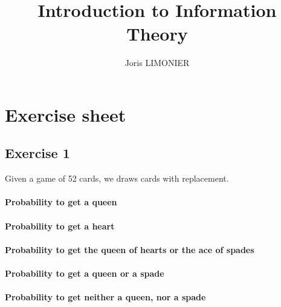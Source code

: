 \documentclass{article}
\title{Introduction to Information Theory}
\author{Joris LIMONIER}
\newcommand{\1}{\mathbf{1}}
\begin{document}
\maketitle

\tableofcontents

\section{Exercise sheet}
\subsection{Exercise 1}
Given a game of 52 cards, we draws cards with replacement.

\paragraph{Probability to get a queen}
\paragraph{Probability to get a heart}
\paragraph{Probability to get the queen of hearts or the ace of spades}
\paragraph{Probability to get a queen or a spade}
\paragraph{Probability to get neither a queen, nor a spade}
\end{document}
